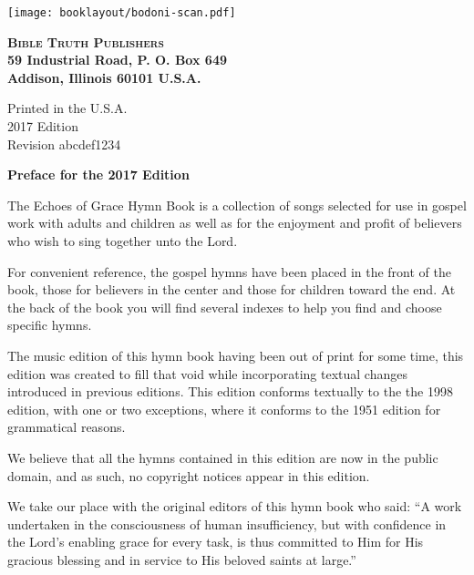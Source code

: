 \documentclass{book}
\begin{document}

\vspace*{1in}

\noindent\hfil\texttt{[image: booklayout/bodoni-scan.pdf]}\hfil

\vfill

\begin{center}
\textbf{
\large\textsc{Bible Truth Publishers}\\
\small{59 Industrial Road, P. O. Box 649\\
Addison, Illinois 60101 U.S.A.\\
}
}
\end{center}

\pagebreak

\vspace*{\fill}
\begin{center}
Printed in the U.S.A.\\
2017 Edition\\
Revision abcdef1234
\end{center}

\pagebreak


\vspace*{1in}
\noindent\hfil{\textbf{Preface for the 2017 Edition}}\hfil

The {\textit{}Echoes of Grace Hymn Book} is a collection of songs selected for
use in gospel work with adults and children as well as for the enjoyment and
profit of believers who wish to sing together unto the Lord.

For convenient reference, the gospel hymns have been placed in the front of the
book, those for believers in the center and those for children toward the end.
At the back of the book you will find several indexes to help you find and
choose specific hymns.

The music edition of this hymn book having been out of print for some time,
this edition was created to fill that void while incorporating textual changes
introduced in previous editions. This edition conforms textually to the the
1998 edition, with one or two exceptions, where it conforms to the 1951 edition
for grammatical reasons.

We believe that all the hymns contained in this edition are now in the public
domain, and as such, no copyright notices appear in this edition.

We take our place with the original editors of this hymn book who said: ``A
work undertaken in the consciousness of human insufficiency, but with
confidence in the Lord's enabling grace for every task, is thus committed to
Him for His gracious blessing and in service to His beloved saints at large.''

\vspace*{\fill}
\end{document}
